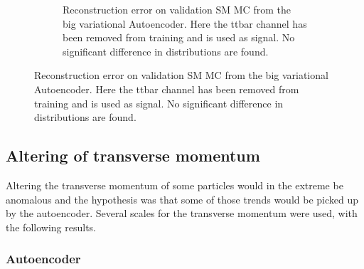 \begin{figure}[h!]
\begin{subfigure}{.45\textwidth}
        \caption{Reconstruction error on validation SM MC from the big variational Autoencoder. Here the ttbar channel has been removed from training and 
        is used as signal. No significant difference in distributions are found. }
        \label{fig:vae_big_ttbar}
    \end{subfigure}
    \hfill 
    \label{fig:vae_big_channel_3}
\end{figure}

\newpage

\subsection*{Altering of transverse momentum}
Altering the transverse momentum of some particles would in the extreme be anomalous and the hypothesis was that some of those trends would be
picked up by the autoencoder. Several scales for the transverse momentum were used, with the following results.

\subsubsection*{Autoencoder}

